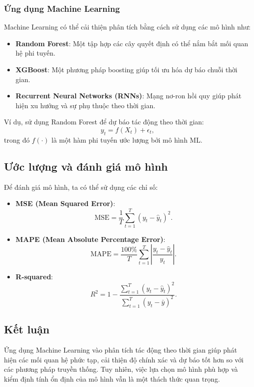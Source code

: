 \subsubsection{Ứng dụng Machine Learning}
Machine Learning có thể cải thiện phân tích bằng cách sử dụng các mô hình như:

\begin{itemize}
    \item \textbf{Random Forest}: Một tập hợp các cây quyết định có thể nắm bắt mối quan hệ phi tuyến.
    \item \textbf{XGBoost}: Một phương pháp boosting giúp tối ưu hóa dự báo chuỗi thời gian.
    \item \textbf{Recurrent Neural Networks (RNNs)}: Mạng nơ-ron hồi quy giúp phát hiện xu hướng và sự phụ thuộc theo thời gian.
\end{itemize}

Ví dụ, sử dụng Random Forest để dự báo tác động theo thời gian:
\begin{equation}
    y_t = f(X_t) + \epsilon_t,
\end{equation}
trong đó $f(\cdot)$ là một hàm phi tuyến ước lượng bởi mô hình ML.

\subsection{Ước lượng và đánh giá mô hình}
Để đánh giá mô hình, ta có thể sử dụng các chỉ số:
\begin{itemize}
    \item \textbf{MSE (Mean Squared Error)}:
    \begin{equation}
        \text{MSE} = \frac{1}{T} \sum_{t=1}^{T} (y_t - \hat{y}_t)^2.
    \end{equation}
    \item \textbf{MAPE (Mean Absolute Percentage Error)}:
    \begin{equation}
        \text{MAPE} = \frac{100\%}{T} \sum_{t=1}^{T} \left| \frac{y_t - \hat{y}_t}{y_t} \right|.
    \end{equation}
    \item \textbf{R-squared}:
    \begin{equation}
        R^2 = 1 - \frac{\sum_{t=1}^{T} (y_t - \hat{y}_t)^2}{\sum_{t=1}^{T} (y_t - \bar{y})^2}.
    \end{equation}
\end{itemize}

\subsection{Kết luận}
Ứng dụng Machine Learning vào phân tích tác động theo thời gian giúp phát hiện các mối quan hệ phức tạp, cải thiện độ chính xác và dự báo tốt hơn so với các phương pháp truyền thống. Tuy nhiên, việc lựa chọn mô hình phù hợp và kiểm định tính ổn định của mô hình vẫn là một thách thức quan trọng.
